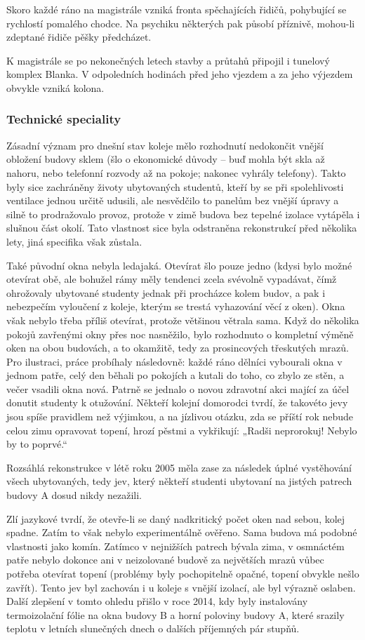 Skoro každé ráno na magistrále vzniká fronta spěchajících řidičů, pohybující se
rychlostí pomalého chodce. Na psychiku některých pak působí příznivě, mohou-li
zdeptané řidiče pěšky předcházet.

K magistrále se po nekonečných letech stavby a průtahů připojil i tunelový
komplex Blanka. V odpoledních hodinách před jeho vjezdem a za jeho výjezdem
obvykle vzniká kolona.


\subsubsection{Technické speciality}
Zásadní význam pro dnešní stav koleje mělo rozhodnutí nedokončit vnější obložení
budovy sklem (šlo o ekonomické důvody – buď mohla být skla až nahoru, nebo
telefonní rozvody až na pokoje; nakonec vyhrály telefony). Takto byly sice
zachráněny životy ubytovaných studentů, kteří by se při spolehlivosti ventilace
jednou určitě udusili, ale nesvědčilo to panelům bez vnější úpravy a silně to
prodražovalo provoz, protože v zimě budova bez tepelné izolace vytápěla i
slušnou část okolí. Tato vlastnost sice byla odstraněna rekonstrukcí před
několika lety, jiná specifika však zůstala.

Také původní okna nebyla ledajaká. Otevírat šlo pouze jedno (kdysi bylo možné
otevírat obě, ale bohužel rámy měly tendenci zcela svévolně vypadávat, čímž
ohrožovaly ubytované studenty jednak při procházce kolem budov, a pak i
nebezpečím vyloučení z koleje, kterým se trestá vyhazování věcí z oken). Okna
však nebylo třeba příliš otevírat, protože většinou větrala sama. Když do
několika pokojů zavřenými okny přes noc nasněžilo, bylo rozhodnuto o kompletní
výměně oken na obou budovách, a to okamžitě, tedy za prosincových třeskutých
mrazů. Pro ilustraci, práce probíhaly následovně: každé ráno dělníci vybourali
okna v jednom patře, celý den běhali po pokojích a kutali do toho, co zbylo ze
stěn, a večer vsadili okna nová. Patrně se jednalo o novou zdravotní akci mající
za účel donutit studenty k otužování. Někteří kolejní domorodci tvrdí, že
takovéto jevy jsou spíše pravidlem než výjimkou, a na jízlivou otázku, zda se
příští rok nebude celou zimu opravovat topení, hrozí pěstmi a vykřikují: „Radši
neprorokuj! Nebylo by to poprvé.“

Rozsáhlá rekonstrukce v létě roku 2005 měla zase za následek úplné vystěhování
všech ubytovaných, tedy jev, který někteří studenti ubytovaní na jistých patrech
budovy A dosud nikdy nezažili.

Zlí jazykové tvrdí, že otevře-li se daný nadkritický počet oken nad sebou, kolej
spadne. Zatím to však nebylo experimentálně ověřeno. Sama budova má podobné
vlastnosti jako komín. Zatímco v nejnižších patrech bývala zima, v osmnáctém
patře nebylo dokonce ani v neizolované budově za největších mrazů vůbec potřeba
otevírat topení (problémy byly pochopitelně opačné, topení obvykle nešlo
zavřít). Tento jev byl zachován i u koleje s vnější izolací, ale byl výrazně
oslaben. Další zlepšení v tomto ohledu přišlo v roce 2014, kdy byly instalovány
termoizolační fólie na okna budovy B a horní poloviny budovy A, které srazily
teplotu v letních slunečných dnech o dalších příjemných pár stupňů.

